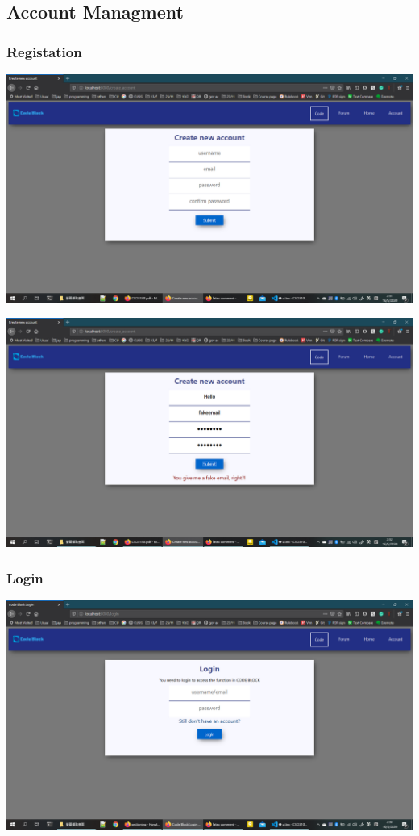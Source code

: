 \subsection{Account Managment}
\subsubsection{Registation}
\includegraphics[scale=0.4]{Doc/Pics/create_account_no_msg.png}

\includegraphics[scale=0.4]{Doc/Pics/create_account_msg.png}

\subsubsection{Login}
\includegraphics[scale=0.4]{Doc/Pics/login_no_msg.png}

